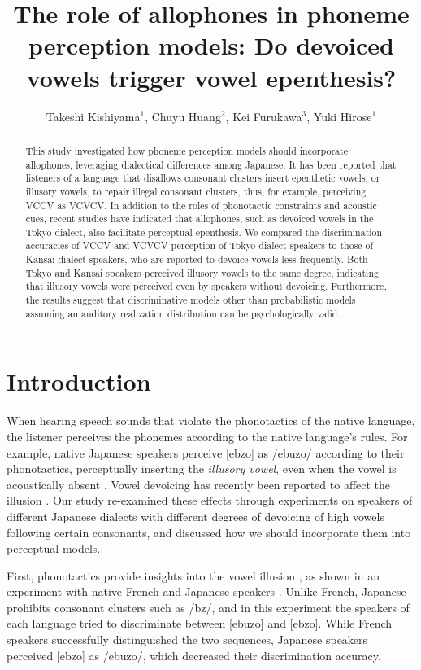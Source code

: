 \documentclass[a4paper,11pt,twocolumn]{article}
\title{The role of allophones in phoneme perception models: Do devoiced vowels trigger vowel epenthesis?}
\author{
    Takeshi Kishiyama$^1$,
    Chuyu Huang$^2$,
    Kei Furukawa$^3$,
    Yuki Hirose$^1$}
\begin{document}
\maketitle

\begin{abstract}
This study investigated how phoneme perception models should incorporate allophones, leveraging dialectical differences among Japanese. It has been reported that listeners of a language that disallows consonant clusters insert epenthetic vowels, or illusory vowels, to repair illegal consonant clusters, thus, for example, perceiving VCCV as VCVCV. In addition to the roles of phonotactic constraints and acoustic cues, recent studies have indicated that allophones, such as devoiced vowels in the Tokyo dialect, also facilitate perceptual epenthesis. We compared the discrimination accuracies of VCCV and VCVCV perception of Tokyo-dialect speakers to those of Kansai-dialect speakers, who are reported to devoice vowels less frequently. Both Tokyo and Kansai speakers perceived illusory vowels to the same degree, indicating that illusory vowels were perceived even by speakers without devoicing. Furthermore, the results suggest that discriminative models other than probabilistic models assuming an auditory realization distribution can be psychologically valid.
\end{abstract}


\section{Introduction}

When hearing speech sounds that violate the phonotactics of the native language, the listener perceives the phonemes according to the native language's rules. For example, native Japanese speakers perceive [ebzo] as /ebuzo/ according to their phonotactics, perceptually inserting the \textit{illusory vowel}, even when the vowel is acoustically absent \cite{dupoux1999epentheticvi, dupoux2011illusory}. Vowel devoicing has recently been reported to affect the illusion \cite{kilpatrick2018japanese}. Our study re-examined these effects through experiments on speakers of different Japanese dialects with different degrees of devoicing of high vowels following certain consonants, and discussed how we should incorporate them into perceptual models.

First, phonotactics provide insights into the vowel illusion \cite{halle2014special, monahan2009not, mattingley2015influence}, as shown in an experiment with native French and Japanese speakers \cite{dupoux1999epentheticvi}. Unlike French, Japanese prohibits consonant clusters such as /bz/, and in this experiment the speakers of each language tried to discriminate between [ebuzo] and [ebzo]. While French speakers successfully distinguished the two sequences, Japanese speakers perceived [ebzo] as /ebuzo/, which decreased their discrimination accuracy.
\end{document}
